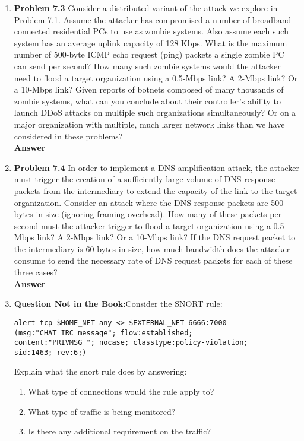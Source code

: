 \documentclass[12pt]{article}
\begin{document}
\begin{enumerate}
\item \textbf{Problem 7.3} Consider a distributed variant of the attack we explore in Problem 7.1. Assume the attacker has compromised a number of broadband-connected residential PCs to use as zombie systems. Also assume each such system has an average uplink capacity of 128 Kbps. What is the maximum number of 500-byte ICMP echo request (ping) packets a single zombie PC can send per second? How many such zombie systems would the attacker need to flood a target organization using a 0.5-Mbps link? A 2-Mbps link? Or a 10-Mbps link? Given reports of botnets composed of many thousands of zombie systems, what can you conclude about their controller’s ability to launch DDoS attacks on multiple such organizations simultaneously? Or on a major organization with multiple, much larger network links than we have considered in these problems? \\

\textbf{Answer} \\

\item \textbf{Problem 7.4} In order to implement a DNS amplification attack, the attacker must trigger the creation of a sufficiently large volume of DNS response packets from the intermediary to extend the capacity of the link to the target organization. Consider an attack where the DNS response packets are 500 bytes in size (ignoring framing overhead). How many of these packets per second must the attacker trigger to flood a target organization using a 0.5-Mbps link? A 2-Mbps link? Or a 10-Mbps link? If the DNS request packet to the intermediary is 60 bytes in size, how much bandwidth does the attacker consume to send the necessary rate of DNS request packets for each of these three cases? \\

\textbf{Answer} \\

\item \textbf{Question Not in the Book:}Consider the SNORT rule:
\vspace{-1em}

{\color{blue}
\begin{verbatim}
alert tcp $HOME_NET any <> $EXTERNAL_NET 6666:7000
(msg:"CHAT IRC message"; flow:established;
content:"PRIVMSG "; nocase; classtype:policy-violation;
sid:1463; rev:6;)
\end{verbatim}
}
 Explain what the  snort rule does by answering:
 \begin{enumerate}
   \item What type of connections would the rule apply to?
   \item What type of traffic is being monitored?
   \item Is there any additional requirement on the traffic?
 \end{enumerate} \\


\end{enumerate}
\end{document}

